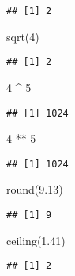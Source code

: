 \documentclass[
]{article}
\newenvironment{Shaded}{\begin{snugshade}}{\end{snugshade}}
\newcommand{\DecValTok}[1]{\textcolor[rgb]{0.00,0.00,0.81}{#1}}
\newcommand{\FloatTok}[1]{\textcolor[rgb]{0.00,0.00,0.81}{#1}}
\newcommand{\FunctionTok}[1]{\textcolor[rgb]{0.00,0.00,0.00}{#1}}
\newcommand{\NormalTok}[1]{#1}
\newcommand{\SpecialCharTok}[1]{\textcolor[rgb]{0.00,0.00,0.00}{#1}}
\begin{document}
\begin{verbatim}
## [1] 2
\end{verbatim}

\begin{Shaded}
\begin{Highlighting}[]
\FunctionTok{sqrt}\NormalTok{(}\DecValTok{4}\NormalTok{)}
\end{Highlighting}
\end{Shaded}

\begin{verbatim}
## [1] 2
\end{verbatim}

\begin{Shaded}
\begin{Highlighting}[]
\DecValTok{4} \SpecialCharTok{\^{}} \DecValTok{5}
\end{Highlighting}
\end{Shaded}

\begin{verbatim}
## [1] 1024
\end{verbatim}

\begin{Shaded}
\begin{Highlighting}[]
\DecValTok{4} \SpecialCharTok{**} \DecValTok{5}
\end{Highlighting}
\end{Shaded}

\begin{verbatim}
## [1] 1024
\end{verbatim}

\begin{Shaded}
\begin{Highlighting}[]
\FunctionTok{round}\NormalTok{(}\FloatTok{9.13}\NormalTok{)}
\end{Highlighting}
\end{Shaded}

\begin{verbatim}
## [1] 9
\end{verbatim}

\begin{Shaded}
\begin{Highlighting}[]
\FunctionTok{ceiling}\NormalTok{(}\FloatTok{1.41}\NormalTok{)}
\end{Highlighting}
\end{Shaded}

\begin{verbatim}
## [1] 2
\end{verbatim}
\end{document}
